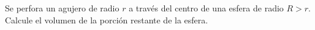 \item Se perfora un agujero de radio $r$ a través del centro de una esfera de radio $R > r$. Calcule el volumen de la porción restante de la esfera.
